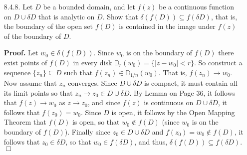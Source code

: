 \documentclass[9pt]{article}
\newcommand{\qed}{\hfill \ensuremath{\Box}}
\begin{document}
\begin{enumerate}
   \item[8.4.8.]  Let $D$ be a bounded domain, and let $f(z)$ be a continuous
                  function on $D \cup \delta D$ that is analytic on $D$. Show
                  that $\delta(f(D)) \subseteq f(\delta D)$, that is, the 
                  boundary of the open set $f(D)$ is contained in the image
                  under $f(z)$ of the boundary of $D$.

      \textbf{Proof.} Let $w_0 \in \delta(f(D))$. Since $w_0$ is on the boundary
      of $f(D)$ there exist points of $f(D)$ in every disk
      $\mathbb{D}_r(w_0) = \{|z - w_0| < r\}$. So construct a sequence
      $\{z_n\} \subseteq D$ such that $f(z_n) \in \mathbb{D}_{1/n}(w_0)$. That
      is, $f(z_n) \rightarrow w_0$. Now assume that $z_n$ converges. Since
      $D \cup \delta D$ is compact, it must contain all its limit points so that
      $z_n \rightarrow z_0 \in D \cup \delta D$. By Lemma on Page 36, it follows
      that $f(z) \rightarrow w_0$ as $z \rightarrow z_0$, and since $f(z)$ is
      continuous on $D \cup \delta D$, it follows that $f(z_0) = w_0$. Since $D$
      is open, it follows by the Open Mapping Theorem that $f(D)$ is open, so
      that $w_0 \notin f(D)$ (since $w_0$ is on the boundary of $f(D)$). Finally
      since $z_0 \in D \cup \delta D$ and $f(z_0) = w_0 \notin f(D)$, it follows
      that $z_0 \in \delta D$, so that $w_0 \in f(\delta D)$, and thus,
      $\delta(f(D)) \subseteq f(\delta D)$. \qed
\end{enumerate}
\end{document}

